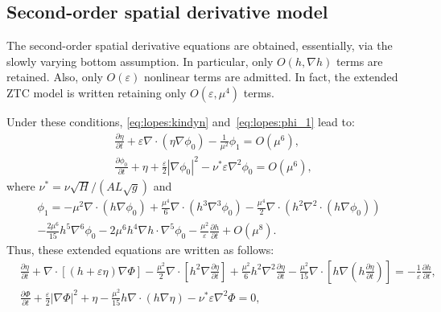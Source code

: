 \subsection{Second-order spatial derivative model}
The second-order spatial derivative equations are obtained,
essentially, via the slowly varying bottom assumption. In particular,
only $O(h,\nabla h)$ terms are retained.  Also, only $O(\varepsilon)$
nonlinear terms are admitted.  In fact, the extended ZTC model is
written retaining only $O(\varepsilon,\mu^4)$ terms.

Under these conditions, \eqref{eq:lopes:kindyn} and~\eqref{eq:lopes:phi_1}
lead to:
\begin{subequations}
\label{eq:lopes:kindyn2}
\begin{align} &\displaystyle\frac{\partial \eta}{\partial
    t}+\varepsilon\nabla\cdot(\eta\nabla\phi_0)
  -\frac{1}{\mu^2}\phi_1=O(\mu^{6}),
  \label{eq:lopes:kindyn2-a}
  \\ &\displaystyle\frac{\partial \phi_0}{\partial t}+\eta +
  \frac{\varepsilon}{2}
  \left|\nabla\phi_0\right|^2-\nu^*\varepsilon\nabla^2\phi_0
  =O(\mu^{6}),
  \label{eq:lopes:kindyn2-b}
\end{align}
\end{subequations}
where $\nu^*=\nu\sqrt{H}/(AL\sqrt{g})$ and
\begin{multline}
\label{eq:lopes:phi_2}
\phi_1= -\mu^{2}\nabla\cdot\left(h\nabla\phi_0\right)
+\frac{\mu^{4}}{6}\nabla\cdot\left(h^3\nabla^3\phi_0\right)
-\frac{\mu^{4}}{2}\nabla\cdot\left(h^2
\nabla^2\cdot\left(h\nabla\phi_0\right)
\right)\\
-\frac{2\mu^6}{15}h^5\nabla^6\phi_0-2\mu^6h^4\nabla
h\cdot\nabla^5\phi_0
-\frac{\mu^2}{\varepsilon}\frac{\partial h}{\partial t}+O(\mu^{8}).
\end{multline}
Thus, these extended equations are written as follows:
\begin{subequations}
\label{eq:lopes:ztcdimensionless}
\begin{align}
  &\frac{\partial\eta}{\partial t}
  +\nabla\cdot[(h+\varepsilon\eta)\nabla{\Phi}] -\frac{\mu^2}{2}
  \nabla\cdot [h^{2}\nabla\frac{\partial \eta} {\partial t}]
  +\frac{\mu^2}{6}h^{2}\nabla^2\frac{\partial\eta}{\partial t}
  -\frac{\mu^2}{15}\nabla\cdot[h\nabla(h\frac{\partial\eta}
  {\partial t})]=-\frac{1} {\varepsilon}\frac{\partial h}{\partial
    t}, \label{eq:lopes:ztcdimensionless-a}\\ &\frac{\partial
    \Phi}{\partial t} +\frac{\varepsilon}{2}|\nabla\Phi|^2+\eta-
  \frac{\mu^2}{15}h\nabla\cdot(h\nabla\eta)-\nu^*\varepsilon
  \nabla^2\Phi = 0,
  \label{eq:lopes:ztcdimensionless-b}
\end{align}
\end{subequations}
